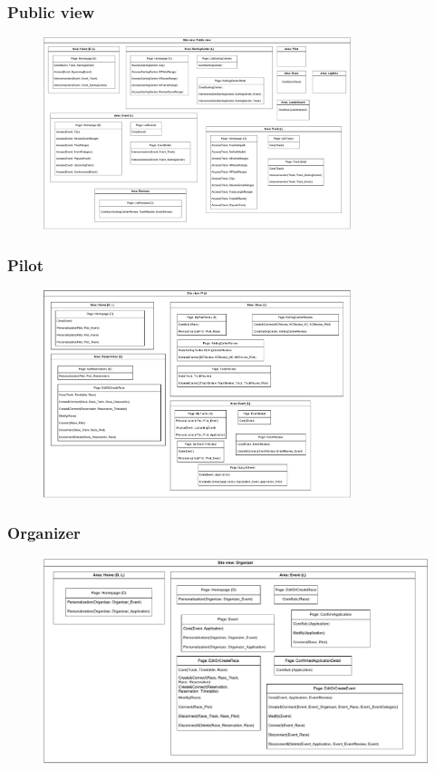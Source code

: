 \documentclass{beamer}
\begin{document}
\begin{frame}
    \frametitle{Public view}
    \begin{figure}
        \centering
        \includegraphics[width=0.8\textwidth]{drawio/public-view.pdf}
    \end{figure}
\end{frame}

\begin{frame}
    \frametitle{Pilot}
    \begin{figure}
        \centering
        \includegraphics[width=0.8\textwidth]{drawio/pilot-view.pdf}
    \end{figure}
\end{frame}

\begin{frame}
    \frametitle{Organizer}
    \begin{figure}
        \centering
        \includegraphics[width=1\textwidth]{drawio/organizer-view.pdf}
    \end{figure}
\end{frame}
\end{document}
